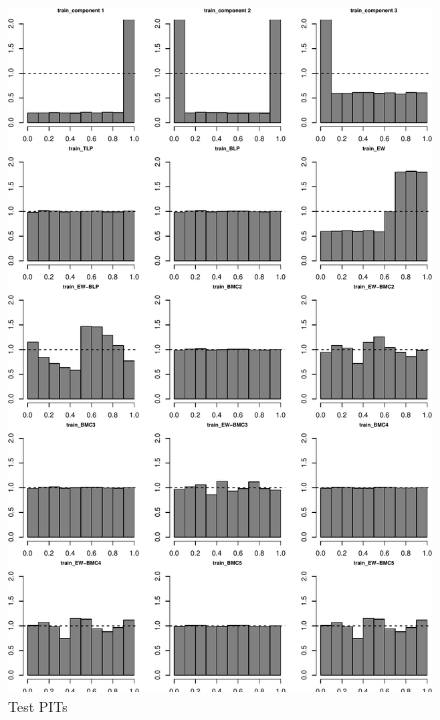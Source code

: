\documentclass[
]{article}
\begin{document}
\clearpage

\begin{figure}[h]

{\centering \includegraphics{applied_blp_sim_files/figure-latex/unnamed-chunk-13-1} 

}

\caption{Test PITs}\label{fig:unnamed-chunk-13}
\end{figure}

\clearpage
\end{document}
